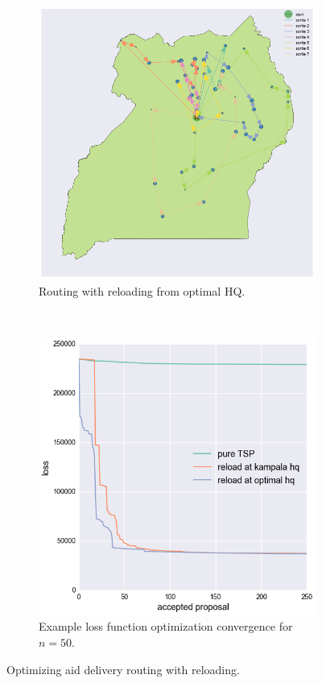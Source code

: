 \documentclass[a0,final]{a0poster}
\begin{document}
\begin{multicols}{3}
\begin{figure}[H]
  \centering
  \begin{subfigure}[b]{0.5\columnwidth}
    \centering
    \includegraphics[width=\textwidth]{../write-up/figures/routing-reloading-hq-optimal}
    \caption{Routing with reloading from optimal HQ.}
    \label{fig:routing-reloading-hq-optimal}
  \end{subfigure}~\begin{subfigure}[b]{0.5\columnwidth}
    \centering
    \centering
    \includegraphics[width=\textwidth]{../write-up/figures/comparative-loss-plot}
    \caption{Example loss function optimization convergence for $n=50$.}
    \label{fig:comparative-loss-plot}
  \end{subfigure}
  \caption{Optimizing aid delivery routing with reloading.}
\end{figure}


\end{multicols}
\end{document}
